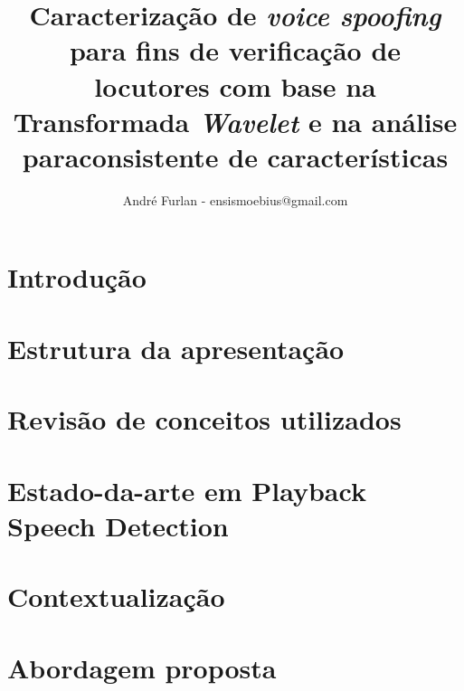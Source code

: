 

\title{Caracterização de \textit{voice spoofing} para fins de verificação de locutores com base na Transformada \textit{Wavelet} e na análise paraconsistente de características}


\author{André Furlan - ensismoebius@gmail.com}

\date{\the\year}


	
	\frame{\titlepage}
	
	\section{Introdução}
		

	\section{Estrutura da apresentação}
		

	\section{Revisão de conceitos utilizados}
		
		
		
		
		
		
		
	
	\section{Estado-da-arte em Playback Speech Detection}
		
		
	\section{Contextualização}
		

	\section{Abordagem proposta}
		
		
		
		
